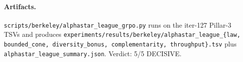 \paragraph{Artifacts.}
\texttt{scripts/berkeley/alphastar\_league\_grpo.py} runs on the
iter-127 Pillar-3 TSVs and produces
\texttt{experiments/results/berkeley/alphastar\_league\_\{law,
bounded\_cone, diversity\_bonus, complementarity, throughput\}.tsv}
plus \texttt{alphastar\_league\_summary.json}. Verdict: 5/5 DECISIVE.
